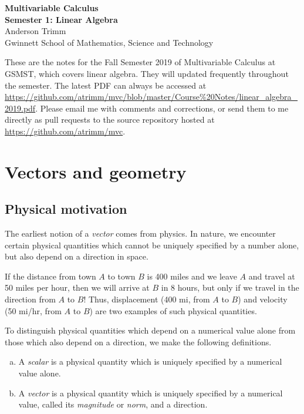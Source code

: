 \documentclass[12pt,letterpaper,reqno]{article}
\numberwithin{equation}{section}
\newcommand{\ti}[1]{\textit{#1}}
\newcommand{\tb}[1]{\textbf{#1}}
\begin{document}
\pagestyle{fancy}
\lhead{{\tiny \color{gray} \tt \gitAuthorIsoDate}}
\chead{\tiny \ti{Linear Algebra, GSMST 2018-2019}}
\rhead{{\tiny \color{gray} \tt \gitAbbrevHash}}
\renewcommand{\headrulewidth}{0.5pt}


\begin{center}
\tb{Multivariable Calculus \\
Semester 1: Linear Algebra} \\
Anderson Trimm \\
Gwinnett School of Mathematics, Science and Technology \\
\end{center}

{These are the notes for the Fall Semester 2019
of Multivariable Calculus at GSMST, which covers linear algebra. They will updated frequently throughout the semester. The latest PDF can always be accessed
at \small \url{https://github.com/atrimm/mvc/blob/master/Course%20Notes/linear_algebra_2019.pdf}.} Please email me with comments and corrections, or send them to me directly as pull requests to the source repository hosted at \small \url{https://github.com/atrimm/mvc}.

\tableofcontents
\renewcommand{\listtheoremname}{Quick reference}
\listoftheorems[onlynamed]

\newpage

\section{Vectors and geometry}\label{sec:vectors_and_geometry}
\subsection{Physical motivation}
The earliest notion of a \emph{vector} comes from physics. In nature, we encounter certain physical quantities which cannot be uniquely specified by a number alone, but also depend on a direction in space. 

\begin{example}\label{ex:disp}
If the distance from town $A$ to town $B$ is 400 miles and we leave $A$ and travel at 50 miles per hour, then we will arrive at $B$ in 8 hours, but only if we travel in the direction from $A$ to $B$! Thus, displacement (400 mi, from $A$ to $B$) and velocity (50 mi/hr, from $A$ to $B$) are two examples of such physical quantities.
\end{example}
To distinguish physical quantities which depend on a numerical value alone from those which also depend on a direction, we make the following definitions. 
\begin{defn}
\begin{enumerate}[(a)] \hspace{10cm}
	\item A \emph{scalar} is a physical quantity which is uniquely specified by a numerical value alone.
	\item A \emph{vector} is a physical quantity which is uniquely specified by a numerical value, called its \emph{magnitude} or \emph{norm}, and a direction.
\end{enumerate}
\end{defn}
\end{document}
